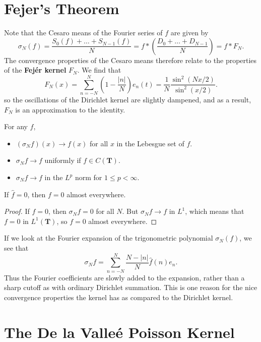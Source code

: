 \section{Fejer's Theorem}

Note that the Cesaro means of the Fourier series of $f$ are given by
%
\[ \sigma_N(f) = \frac{S_0(f) + \dots + S_{N-1}(f)}{N} = f * \left( \frac{D_0 + \dots + D_{N-1}}{N} \right) = f * F_N. \]
%
The convergence properties of the Cesaro means therefore relate to the properties of the {\bf Fej\'{e}r kernel} $F_N$. We find that
%
\[ F_N(x) = \sum_{n = -N}^N \left( 1 - \frac{|n|}{N} \right) e_n(t) = \frac{1}{N} \frac{\sin^2(Nx/2)}{\sin^2(x/2)}. \]
%
so the oscillations of the Dirichlet kernel are slightly dampened, and as a result, $F_N$ is an approximation to the identity.

\begin{theorem} For any $f$,
   	\begin{itemize}
   		\item $(\sigma_N f)(x) \to f(x)$ for all $x$ in the Lebesgue set of $f$.
   		\item $\sigma_N f \to f$ uniformly if $f \in C(\mathbf{T})$.
   		\item $\sigma_N f \to f$ in the $L^p$ norm for $1 \leq p < \infty$.
   	\end{itemize}

\end{theorem}

\begin{corollary}
	If $\widehat{f} = 0$, then $f = 0$ almost everywhere.
\end{corollary}
\begin{proof}
	If $\widehat{f} = 0$, then $\sigma_N f = 0$ for all $N$. But $\sigma_N f \to f$ in $L^1$, which means that $f = 0$ in $L^1(\mathbf{T})$, so $f = 0$ almost everywhere.
\end{proof}

If we look at the Fourier expansion of the trigonometric polynomial $\sigma_N(f)$, we see that
%
\[ \sigma_N f = \sum_{n = -N}^N \frac{N-|n|}{N} \widehat{f}(n) e_n. \]
%
Thus the Fourier coefficients are slowly added to the expansion, rather than a sharp cutoff as with ordinary Dirichlet summation. This is one reason for the nice convergence properties the kernel has as compared to the Dirichlet kernel.

\section{The De la Valle\'{e} Poisson Kernel}

